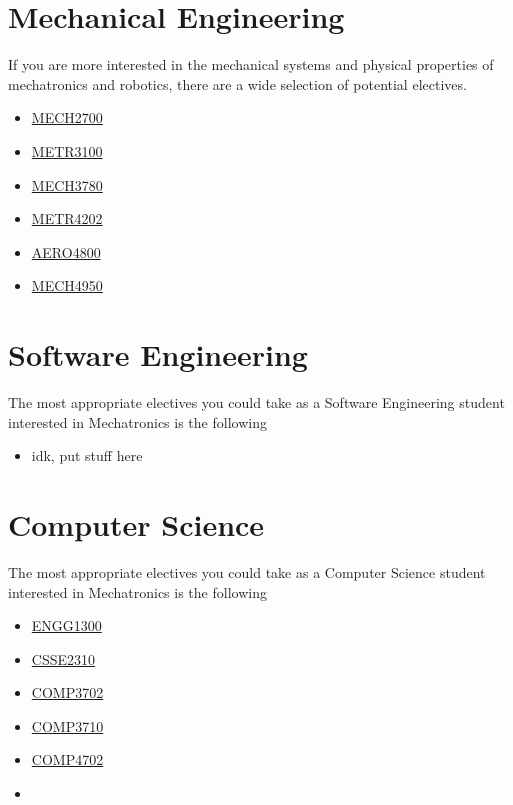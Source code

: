 \documentclass[a4paper,12pt]{report}
\begin{document}
\section{Mechanical Engineering}
If you are more interested in the mechanical systems and physical properties of mechatronics and robotics, there are a wide selection of potential electives.
\begin{multicols}{3}
    \begin{itemize}
        \item \hyperlink{MECH2700}{MECH2700}
        \item \hyperlink{METR3100}{METR3100}
        \item \hyperlink{MECH3780}{MECH3780}
        \item \hyperlink{METR4202}{METR4202}
        \item \hyperlink{AERO4800}{AERO4800}
        \item \hyperlink{MECH4950}{MECH4950}
    \end{itemize}
\end{multicols}

\section{Software Engineering}
The most appropriate electives you could take as a Software Engineering student interested in Mechatronics is the following
\begin{multicols}{3}
    \begin{itemize}
        \item idk, put stuff here
    \end{itemize}
\end{multicols}

\section{Computer Science}
The most appropriate electives you could take as a Computer Science student interested in Mechatronics is the following
\begin{multicols}{3}
    \begin{itemize}
        \item \hyperlink{ENGG1300}{ENGG1300}
        \item \hyperlink{CSSE2310}{CSSE2310}
        \item \hyperlink{COMP3702}{COMP3702}
        \item \hyperlink{COMP3710}{COMP3710}
        \item \hyperlink{COMP4702}{COMP4702}
        \item[]
    \end{itemize}
\end{multicols}
\end{document}
